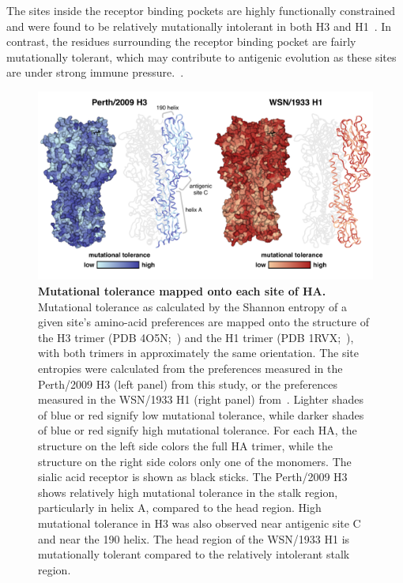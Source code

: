\documentclass[9pt,twocolumn,twoside]{pnas-new}
\begin{document}
The sites inside the receptor binding pockets are highly functionally constrained and were found to be relatively mutationally intolerant in both H3 and H1~\citep{wilson1981structure}.
In contrast, the residues surrounding the receptor binding pocket are fairly mutationally tolerant, which may contribute to antigenic evolution as these sites are under strong immune pressure.~\citep{wiley1981structural}.

\begin{figure}
\centering
\includegraphics[width=16cm]{figs/mut_tolerance/entropy_heatmap.pdf}
\caption{\label{fig:mut_tolerance}
{\bf Mutational tolerance mapped onto each site of HA.}
Mutational tolerance as calculated by the Shannon entropy of a given site's amino-acid preferences are mapped onto the structure of the H3 trimer (PDB 4O5N;~\cite{lee2014receptor}) and the H1 trimer (PDB 1RVX;~\cite{gamblin2004structure}), with both trimers in approximately the same orientation. 
The site entropies were calculated from the preferences measured in the Perth/2009 H3 (left panel) from this study, or the preferences measured in the WSN/1933 H1 (right panel) from~\cite{doud2016accurate}. 
Lighter shades of blue or red signify low mutational tolerance, while darker shades of blue or red signify high mutational tolerance. 
For each HA, the structure on the left side colors the full HA trimer, while the structure on the right side colors only one of the monomers.
The sialic acid receptor is shown as black sticks.
The Perth/2009 H3 shows relatively high mutational tolerance in the stalk region, particularly in helix A, compared to the head region. 
High mutational tolerance in H3 was also observed near antigenic site C and near the 190 helix.
The head region of the WSN/1933 H1 is mutationally tolerant compared to the relatively intolerant stalk region. 
}
\end{figure}
\end{document}
